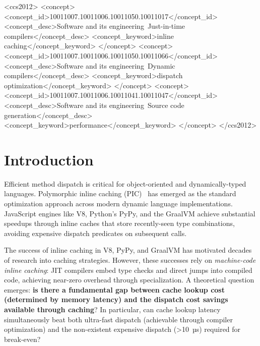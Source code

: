 \documentclass[sigplan,final,acmsmall,review,screen]{acmart}
\begin{document}
\begin{CCSXML}
<ccs2012>
<concept>
<concept_id>10011007.10011006.10011050.10011017</concept_id>
<concept_desc>Software and its engineering~Just-in-time compilers</concept_desc>
<concept_keyword>inline caching</concept_keyword>
</concept>
<concept>
<concept_id>10011007.10011006.10011050.10011066</concept_id>
<concept_desc>Software and its engineering~Dynamic compilers</concept_desc>
<concept_keyword>dispatch optimization</concept_keyword>
</concept>
<concept>
<concept_id>10011007.10011006.10011041.10011047</concept_id>
<concept_desc>Software and its engineering~Source code generation</concept_desc>
<concept_keyword>performance</concept_keyword>
</concept>
</ccs2012>
\end{CCSXML}



\maketitle

\section{Introduction}

Efficient method dispatch is critical for object-oriented and dynamically-typed languages.
Polymorphic inline caching (PIC)~\cite{hoelzle1991optimizing} has emerged as the standard
optimization approach across modern dynamic language implementations. JavaScript engines like V8,
Python's PyPy, and the GraalVM achieve substantial speedups through inline caches that store
recently-seen type combinations, avoiding expensive dispatch predicates on subsequent calls.

The success of inline caching in V8, PyPy, and GraalVM has motivated decades of research into caching strategies. However, these
successes rely on \emph{machine-code inline caching}: JIT compilers embed type checks and direct jumps into compiled code, achieving
near-zero overhead through specialization. A theoretical question emerges: \textbf{is there a fundamental gap between cache lookup cost
(determined by memory latency) and the dispatch cost savings available through caching}? In particular, can cache lookup latency simultaneously
beat both ultra-fast dispatch (achievable through compiler optimization) and the non-existent expensive dispatch (>10~µs) required for break-even?
\end{document}
